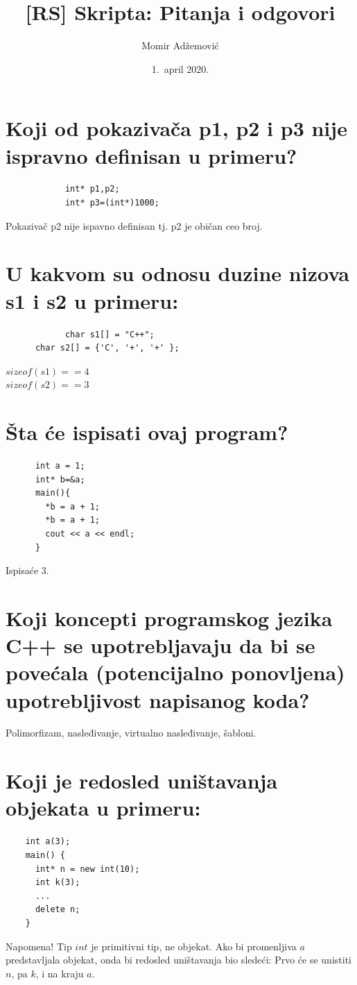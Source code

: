 \documentclass[a4paper]{article}
\begin{document}
\title{[RS] Skripta: Pitanja i odgovori}

\author{Momir Adžemović}

\date{1.~april 2020.}

\maketitle

\tableofcontents

\section{Koji od pokazivača p1, p2 i p3 nije ispravno definisan u primeru?}
		 \begin{lstlisting}
			int* p1,p2;
			int* p3=(int*)1000;\end{lstlisting}
		Pokazivač p2 nije ispavno definisan tj. p2 je običan ceo broj.

\section{U kakvom su odnosu duzine nizova s1 i s2 u primeru:}
		\begin{lstlisting}
			char s1[] = "C++";
      char s2[] = {'C', '+', '+' };\end{lstlisting}
      $sizeof(s1) == 4$\\
      $sizeof(s2) == 3$
    
\section{Šta će ispisati ovaj program?}
    \begin{lstlisting}
      int a = 1;
      int* b=&a;
      main(){
        *b = a + 1;
        *b = a + 1;
        cout << a << endl;
      }\end{lstlisting}

    Ispisaće 3.

\section{Koji koncepti programskog jezika C++ se upotrebljavaju da bi se 
         povećala (potencijalno ponovljena) upotrebljivost napisanog koda?}
    Polimorfizam, nasleđivanje, virtualno nasleđivanje, šabloni.

\section{Koji je redosled uništavanja objekata u primeru:}
    \begin{lstlisting}
    int a(3);
    main() {
      int* n = new int(10);
      int k(3);
      ...
      delete n;
    }\end{lstlisting}
    Napomena! Tip $int$ je primitivni tip, ne objekat. Ako bi promenljiva $a$ predstavljala objekat, 
    onda bi redosled uništavanja bio sledeći: Prvo će se unistiti $n$, pa $k$, i na kraju $a$.
\end{document}
